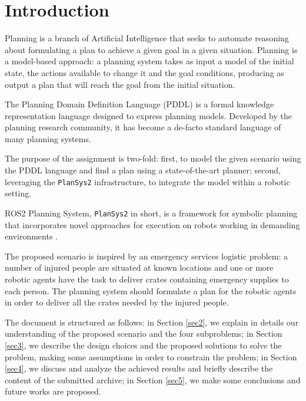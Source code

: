 \section{Introduction}
Planning is a branch of Artificial Intelligence that seeks to automate reasoning about
formulating a plan to achieve a given goal in a given situation. 
Planning is a model-based approach: a planning system takes as input a model of the initial state, 
the actions available to change it and the goal conditions, producing as output a plan 
that will reach the goal from the initial situation.

The Planning Domain Definition Language (PDDL) is a formal knowledge representation language 
designed to express planning models. Developed by the planning research community, 
it has become a de-facto standard language of many planning systems.

The purpose of the assignment is two-fold: first, to model the given scenario using the PDDL language 
and find a plan using a state-of-the-art planner; second, leveraging the \texttt{PlanSys2} \cite{PlanSys2} 
infrastructure, to integrate the model within a robotic setting.

ROS2 Planning System, \texttt{PlanSys2} in short, is a framework for symbolic planning that incorporates 
novel approaches for execution on robots working in demanding environments \cite{PlanSys2}.

The proposed scenario is inspired by an emergency services logistic problem:
a number of injured people are situated at known locations and one or more robotic agents
have the task to deliver crates containing emergency supplies to each person. 
The planning system should formulate a plan for the robotic agents in order to deliver all
the crates needed by the injured people.

The document is structured as follows: in Section \ref{sec2},
we explain in details our understanding of the proposed scenario and the four subproblems; 
in Section \ref{sec3}, we describe the design choices and the proposed solutions to solve the problem,
making some assumptions in order to constrain the problem; %
in Section \ref{sec4}, we discuss and analyze the achieved results and briefly describe the
content of the submitted archive; in Section \ref{sec5}, we make some conclusions and future 
works are proposed.


